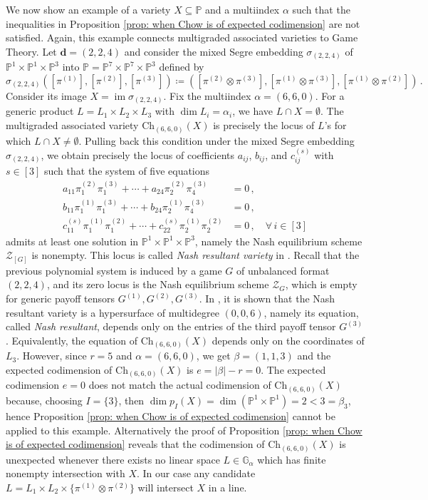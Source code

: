 \documentclass[12pt]{article}
\theoremstyle{definition}
\newenvironment{example}
{\pushQED{\qed}\renewcommand{\qedsymbol}{$\diamond$}\examplex}
{\popQED\endexamplex}
\newcommand{\G}{{\mathbb G}}
\newcommand{\PP}{{\mathbb P}}
\def\bd{{\boldsymbol{d}}}
\def\im{\operatorname{im}}
\newcommand{\kz}{{\mathcal Z}}
\begin{document}
\begin{example}\label{ex: Nash resultants}
We now show an example of a variety $X\subseteq\PP$ and a multiindex $\alpha$ such that the inequalities in Proposition \ref{prop: when Chow is of expected codimension} are not satisfied. Again, this example connects multigraded associated varieties to Game Theory.
Let $\bd=(2,2,4)$ and consider the mixed Segre embedding $\sigma_{(2,2,4)}$ of $\PP^1\times\PP^1\times\PP^3$ into $\PP=\PP^7\times\PP^7\times\PP^3$ defined by
\[
    \sigma_{(2,2,4)}([\pi^{(1)}],[\pi^{(2)}],[\pi^{(3)}]) \coloneqq ([\pi^{(2)}\otimes\pi^{(3)}],[\pi^{(1)}\otimes\pi^{(3)}],[\pi^{(1)}\otimes\pi^{(2)}])\,.
\]
Consider its image $X=\im\sigma_{(2,2,4)}$. Fix the multiindex $\alpha=(6,6,0)$. For a generic product $L=L_1\times L_2\times L_3$ with $\dim L_i=\alpha_i$, we have $L\cap X=\emptyset$. The multigraded associated variety $\mathrm{Ch}_{(6,6,0)}(X)$ is precisely the locus of $L$'s for which $L\cap X\neq\emptyset$. Pulling back this condition under the mixed Segre embedding $\sigma_{(2,2,4)}$, we obtain precisely the locus of coefficients $a_{ij}$, $b_{ij}$, and $c_{ij}^{(s)}$ with $s\in[3]$ such that the system of five equations
\begin{align*}
    a_{11}\pi_1^{(2)}\pi_1^{(3)}+\cdots+a_{24}\pi_2^{(2)}\pi_4^{(3)} &= 0\,,\\
    b_{11}\pi_1^{(1)}\pi_1^{(3)}+\cdots+b_{24}\pi_2^{(1)}\pi_4^{(3)} &= 0\,,\\
    c_{11}^{(s)}\pi_1^{(1)}\pi_1^{(2)}+\cdots+c_{22}^{(s)}\pi_2^{(1)}\pi_2^{(2)} &= 0\,,\quad\forall\,i\in[3]
\end{align*}
admits at least one solution in $\PP^1\times\PP^1\times\PP^3$, namely the Nash equilibrium scheme $\kz_{[G]}$ is nonempty. This locus is called {\em Nash resultant variety} in \cite{abo2026vector}. Recall that the previous polynomial system is induced by a game $G$ of unbalanced format $(2,2,4)$, and its zero locus is the Nash equilibrium scheme $\kz_G$, which is empty for generic payoff tensors $G^{(1)},G^{(2)},G^{(3)}$.
In \cite[Example 3.33]{abo2026vector}, it is shown that the Nash resultant variety is a hypersurface of multidegree $(0,0,6)$, namely its equation, called {\em Nash resultant}, depends only on the entries of the third payoff tensor $G^{(3)}$. Equivalently, the equation of $\mathrm{Ch}_{(6,6,0)}(X)$ depends only on the coordinates of $L_3$.
However, since $r=5$ and $\alpha=(6,6,0)$, we get $\beta=(1,1,3)$ and the expected codimension of $\mathrm{Ch}_{(6,6,0)}(X)$ is $e=|\beta|-r=0$. The expected codimension $e=0$ does not match the actual codimension of $\mathrm{Ch}_{(6,6,0)}(X)$ because, choosing $I=\{3\}$, then $\dim p_I(X)=\dim(\PP^1\times\PP^1)=2<3=\beta_3$, hence Proposition \ref{prop: when Chow is of expected codimension} cannot be applied to this example. Alternatively the proof of Proposition \ref{prop: when Chow is of expected codimension} reveals that the codimension of $\mathrm{Ch}_{(6,6,0)}(X)$ is unexpected whenever there exists no linear space $L\in \G_\alpha$ which has finite nonempty intersection with $X$. In our case any candidate $L=L_1\times L_2\times \{\pi^{(1)}\otimes \pi^{(2)}\}$ will intersect $X$ in a line.


\end{example}
\end{document}
